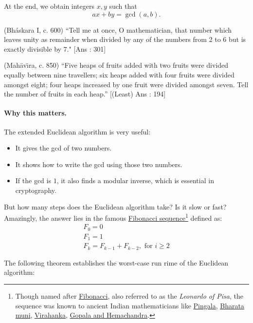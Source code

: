 At the end, we obtain integers $x,y$ such that
\[
ax + by = \gcd(a,b).
\]

\begin{exercise}
(Bh\'{a}skara I, c. 600) ``Tell me at once, O mathematician, that number which leaves unity as remainder when divided by any of the numbers from 2 to 6 but is exactly divisible by 7." [Ans : 301]
\end{exercise}

\begin{exercise}
(Mah\={a}v\={\i}ra, c. 850) ``Five heaps of fruits added with two fruits were divided equally between nine travellers; six heaps added with four fruits were divided amongst eight; four heaps increased by one fruit were divided amongst seven. Tell the number of fruits in each heap.” [(Least) Ans : 194]
\end{exercise}

\paragraph{Why this matters.}
The extended Euclidean algorithm is very useful:
\begin{itemize}
\item It gives the gcd of two numbers.  
\item It shows how to write the gcd using those two numbers.  
\item If the gcd is $1$, it also finds a modular inverse, which is essential in cryptography.  
\end{itemize}

But how many steps does the Euclidean algorithm take? Is it slow or fast? Amazingly, the answer lies in the famous \href{https://en.wikipedia.org/wiki/Fibonacci_sequence}{Fibonacci sequence}\footnote{Though named after \href{https://en.wikipedia.org/wiki/Fibonacci}{Fibonacci}, also referred to as the {\em Leonardo of Pisa}, the sequence was known to ancient Indian mathematicians like \href{https://en.wikipedia.org/wiki/Pingala}{Pingala}, \href{https://en.wikipedia.org/wiki/Bharata\_(sage)}{Bharata muni}, \href{https://en.wikipedia.org/wiki/Virahanka}{Virahanka}, \href{https://en.wikipedia.org/wiki/Hemachandra}{Gopala and Hemachandra}.} defined as:
\[
\begin{array}{l}
F_0 = 0 \\
F_1 = 1 \\
F_k = F_{k-1} + F_{k-2}, \mbox{ for } i \geq 2
\end{array}
\]


The following theorem establishes the worst-case run rime of the Euclidean algorithm:

